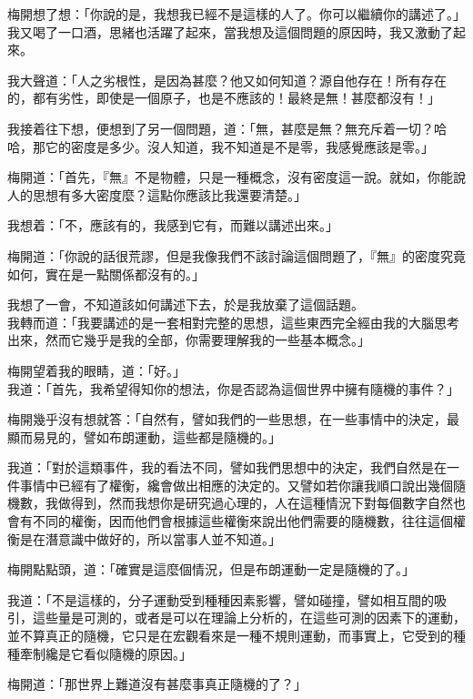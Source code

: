 梅開想了想：「你說的是，我想我已經不是這樣的人了。你可以繼續你的講述了。」
\\


我又喝了一口酒，思緒也活躍了起來，當我想及這個問題的原因時，我又激動了起來。

我大聲道：「人之劣根性，是因為甚麼？他又如何知道？源自他存在！所有存在的，都有劣性，即使是一個原子，也是不應該的！最終是無！甚麼都沒有！」

我接着往下想，便想到了另一個問題，道：「無，甚麼是無？無充斥着一切？哈哈，那它的密度是多少。沒人知道，我不知道是不是零，我感覺應該是零。」

梅開道：「首先，『無』不是物體，只是一種概念，沒有密度這一說。就如，你能說人的思想有多大密度麼？這點你應該比我還要清楚。」

我想着：「不，應該有的，我感到它有，而難以講述出來。」

梅開道：「你說的話很荒謬，但是我像我們不該討論這個問題了，『無』的密度究竟如何，實在是一點關係都沒有的。」

我想了一會，不知道該如何講述下去，於是我放棄了這個話題。
\\


我轉而道：「我要講述的是一套相對完整的思想，這些東西完全經由我的大腦思考出來，然而它幾乎是我的全部，你需要理解我的一些基本概念。」

梅開望着我的眼睛，道：「好。」
\\


我道：「首先，我希望得知你的想法，你是否認為這個世界中擁有隨機的事件？」

梅開幾乎沒有想就答：「自然有，譬如我們的一些思想，在一些事情中的決定，最顯而易見的，譬如布朗運動，這些都是隨機的。」

我道：「對於這類事件，我的看法不同，譬如我們思想中的決定，我們自然是在一件事情中已經有了權衡，纔會做出相應的決定的。又譬如若你讓我順口說出幾個隨機數，我做得到，然而我想你是研究過心理的，人在這種情況下對每個數字自然也會有不同的權衡，因而他們會根據這些權衡來說出他們需要的隨機數，往往這個權衡是在潛意識中做好的，所以當事人並不知道。」

梅開點點頭，道：「確實是這麼個情況，但是布朗運動一定是隨機的了。」

我道：「不是這樣的，分子運動受到種種因素影響，譬如碰撞，譬如相互間的吸引，這些量是可測的，或者是可以在理論上分析的，在這些可測的因素下的運動，並不算真正的隨機，它只是在宏觀看來是一種不規則運動，而事實上，它受到的種種牽制纔是它看似隨機的原因。」

梅開道：「那世界上難道沒有甚麼事真正隨機的了？」

